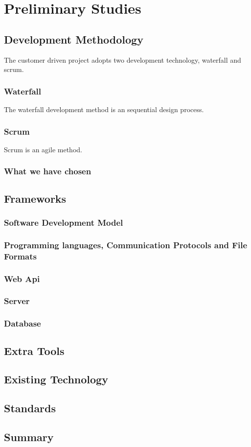 \section{Preliminary Studies}
\subsection{Development Methodology}
The customer driven project adopts two development technology, waterfall and scrum.
\subsubsection{Waterfall}
The waterfall development method is an sequential design process.
\subsubsection{Scrum}
Scrum is an agile method.
\subsubsection{What we have chosen}
\subsection{Frameworks}
\subsubsection{Software Development Model}
\subsubsection{Programming languages, Communication Protocols and File Formats}
\subsubsection{Web Api}
\subsubsection{Server}
\subsubsection{Database}
\subsection{Extra Tools}
\subsection{Existing Technology}

\subsection{Standards}

\subsection{Summary}